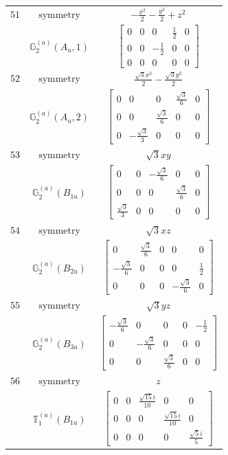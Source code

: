 \documentclass[fleqn,8pt,landscape]{jsarticle}
\begin{document}
\begin{longtable}{ccc}
$ 51 $ & $ \text{symmetry} $ & $ - \frac{x^{2}}{2} - \frac{y^{2}}{2} + z^{2} $ \\
$  $ & $ \mathbb{G}_{2}^{(a)}(A_{u},1) $ & $ \begin{bmatrix} 0 & 0 & 0 & \frac{1}{2} & 0 \\ 0 & 0 & - \frac{1}{2} & 0 & 0 \\ 0 & 0 & 0 & 0 & 0 \end{bmatrix} $ \\ \hline
$ 52 $ & $ \text{symmetry} $ & $ \frac{\sqrt{3} x^{2}}{2} - \frac{\sqrt{3} y^{2}}{2} $ \\
$  $ & $ \mathbb{G}_{2}^{(a)}(A_{u},2) $ & $ \begin{bmatrix} 0 & 0 & 0 & \frac{\sqrt{3}}{6} & 0 \\ 0 & 0 & \frac{\sqrt{3}}{6} & 0 & 0 \\ 0 & - \frac{\sqrt{3}}{3} & 0 & 0 & 0 \end{bmatrix} $ \\ \hline
$ 53 $ & $ \text{symmetry} $ & $ \sqrt{3} x y $ \\
$  $ & $ \mathbb{G}_{2}^{(a)}(B_{1u}) $ & $ \begin{bmatrix} 0 & 0 & - \frac{\sqrt{3}}{6} & 0 & 0 \\ 0 & 0 & 0 & \frac{\sqrt{3}}{6} & 0 \\ \frac{\sqrt{3}}{3} & 0 & 0 & 0 & 0 \end{bmatrix} $ \\ \hline
$ 54 $ & $ \text{symmetry} $ & $ \sqrt{3} x z $ \\
$  $ & $ \mathbb{G}_{2}^{(a)}(B_{2u}) $ & $ \begin{bmatrix} 0 & \frac{\sqrt{3}}{6} & 0 & 0 & 0 \\ - \frac{\sqrt{3}}{6} & 0 & 0 & 0 & \frac{1}{2} \\ 0 & 0 & 0 & - \frac{\sqrt{3}}{6} & 0 \end{bmatrix} $ \\ \hline
$ 55 $ & $ \text{symmetry} $ & $ \sqrt{3} y z $ \\
$  $ & $ \mathbb{G}_{2}^{(a)}(B_{3u}) $ & $ \begin{bmatrix} - \frac{\sqrt{3}}{6} & 0 & 0 & 0 & - \frac{1}{2} \\ 0 & - \frac{\sqrt{3}}{6} & 0 & 0 & 0 \\ 0 & 0 & \frac{\sqrt{3}}{6} & 0 & 0 \end{bmatrix} $ \\ \hline
$ 56 $ & $ \text{symmetry} $ & $ z $ \\
$  $ & $ \mathbb{T}_{1}^{(a)}(B_{1u}) $ & $ \begin{bmatrix} 0 & 0 & \frac{\sqrt{15} i}{10} & 0 & 0 \\ 0 & 0 & 0 & \frac{\sqrt{15} i}{10} & 0 \\ 0 & 0 & 0 & 0 & \frac{\sqrt{5} i}{5} \end{bmatrix} $ \\ \hline

\end{longtable}
\end{document}
